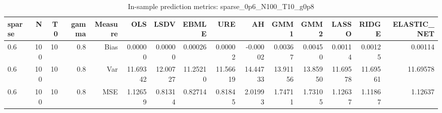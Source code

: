 \begin{table}[!htbp]\centering
\caption{In-sample prediction metrics: sparse_0p6_N100_T10_g0p8}
\label{tab:table2_sparse_0p6_N100_T10_g0p8}
\begin{tabular}{lrrrrrrrrrrrrrr}
\hline
sparse & N & T0 & gamma & Measure & OLS & LSDV & EBMLE & URE & AH & GMM1 & GMM2 & LASSO & RIDGE & ELASTIC_NET \\
\hline
0.6 & 100 & 10 & 0.8 & Bias & 0.00000 & 0.00000 & 0.00026 & 0.00002 & -0.00002 & 0.00367 & 0.00450 & 0.00114 & 0.00125 & 0.00114 \\
0.6 & 100 & 10 & 0.8 & Var & 11.69342 & 12.00727 & 11.25210 & 11.56619 & 14.44733 & 13.91156 & 13.85950 & 11.69578 & 11.69561 & 11.69578 \\
0.6 & 100 & 10 & 0.8 & MSE & 1.12659 & 0.81314 & 0.82714 & 0.81845 & 2.01993 & 1.74711 & 1.73105 & 1.12637 & 1.11867 & 1.12637 \\
\hline
\end{tabular}
\end{table}

